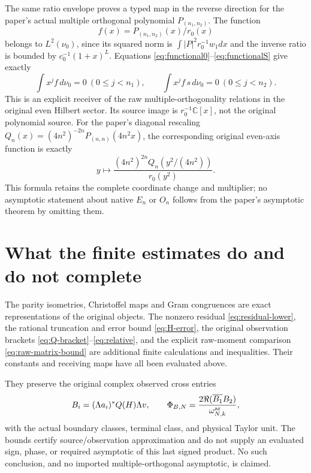 \documentclass[11pt]{article}
\newcommand{\Pol}{\mathbb C[x]}
\begin{document}
The same ratio envelope proves a typed map in the reverse
direction for the paper's actual multiple orthogonal polynomial
$P_{(n_1,n_2)}$. The function
\[
 f(x)=P_{(n_1,n_2)}(x)/r_0(x)
\]
belongs to $L^2(\nu_0)$, since its squared norm is
$\int |P|^2r_0^{-1}w_1dx$ and the inverse ratio is bounded by
$c_0^{-1}(1+x)^L$. Equations
\eqref{eq:functional0}--\eqref{eq:functionalS} give exactly
\[
 \int x^jf\,d\nu_0=0\ (0\leq j<n_1),\qquad
 \int x^jf\,s\,d\nu_0=0\ (0\leq j<n_2).
\]
This is an explicit receiver of the raw multiple-orthogonality
relations in the original even Hilbert sector. Its source image
is $r_0^{-1}\Pol$, not the original polynomial source. For the
paper's diagonal rescaling
$Q_n(x)=(4n^2)^{-2n}P_{(n,n)}(4n^2x)$, the corresponding original
even-axis function is exactly
\[
 y\longmapsto\frac{(4n^2)^{2n}Q_n(y^2/(4n^2))}{r_0(y^2)}.
\]
This formula retains the complete coordinate change and multiplier;
no asymptotic statement about native $E_n$ or $O_n$ follows from
the paper's asymptotic theorem by omitting them.

\section{What the finite estimates do and do not complete}

The parity isometries, Christoffel maps and Gram congruences are
exact representations of the original objects. The nonzero
residual \eqref{eq:residual-lower}, the rational truncation and
error bound \eqref{eq:H-error}, the original observation brackets
\eqref{eq:Q-bracket}--\eqref{eq:relative}, and the explicit
raw-moment comparison \eqref{eq:raw-matrix-bound} are additional
finite calculations and inequalities. Their constants and
receiving maps have all been evaluated above.

They preserve the original complex observed cross entries
\[
 B_i=(\Lambda a_i)^*Q(H)\Lambda v,
 \qquad
 \Phi_{B,N}=\frac{2\Re(\overline{B_1}B_2)}{\omega_{N,k}^{\rm ar}},
\]
with the actual boundary classes, terminal class, and physical
Taylor unit. The bounds certify source/observation approximation
and do not supply an evaluated sign, phase, or required
asymptotic of this last signed product. No such conclusion, and
no imported multiple-orthogonal asymptotic, is claimed.
\end{document}
